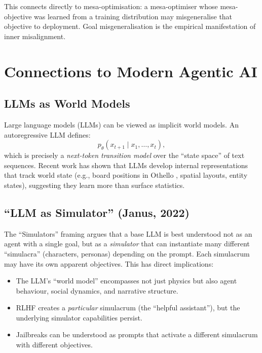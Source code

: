 \documentclass[11pt,a4paper]{article}
\theoremstyle{definition}
\begin{document}
This connects directly to mesa-optimisation: a mesa-optimiser whose
mesa-objective was learned from a training distribution may
misgeneralise that objective to deployment. Goal misgeneralisation is
the empirical manifestation of inner misalignment.

\section{Connections to Modern Agentic AI}\label{sec:modern_agentic}

\subsection{LLMs as World Models}

Large language models (LLMs) can be viewed as implicit world models.
An autoregressive LLM defines:
\begin{equation}
  p_\theta(x_{t+1} \mid x_1, \ldots, x_t),
\end{equation}
which is precisely a \emph{next-token transition model} over the
``state space'' of text sequences. Recent work has shown that LLMs
develop internal representations that track world state (e.g., board
positions in Othello \cite{li2023emergent}, spatial layouts, entity
states), suggesting they learn more than surface statistics.

\subsection{``LLM as Simulator'' (Janus, 2022)}

The ``Simulators'' framing \cite{janus2022simulators} argues that a base
LLM is best understood not as an agent with a single goal, but as a
\emph{simulator} that can instantiate many different ``simulacra''
(characters, personas) depending on the prompt. Each simulacrum may have
its own apparent objectives. This has direct implications:
\begin{itemize}
  \item The LLM's ``world model'' encompasses not just physics but also
    agent behaviour, social dynamics, and narrative structure.
  \item RLHF creates a \emph{particular} simulacrum (the ``helpful
    assistant''), but the underlying simulator capabilities persist.
  \item Jailbreaks can be understood as prompts that activate a
    different simulacrum with different objectives.
\end{itemize}
\end{document}
